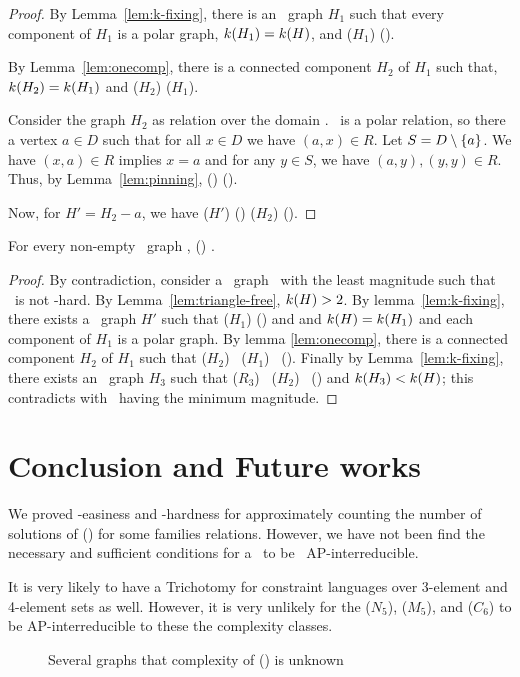 \begin{proof}
By Lemma~\ref{lem:k-fixing}, there is an \RBA\ graph \(H_1\) such that
every component of \(H_1\) is a polar graph, \(k(H_1)=k(H)\), and 
\chom(\(H_1\)) \maple \chom(\mH)\@.

By Lemma~\ref{lem:onecomp}, there is a connected component \(H_2\) of \(H_1\) such that,
\(k(H_2)=k(H_1)\) and \chom(\(H_2\)) \maple \chom(\(H_1\))\@.

Consider the graph \(H_2\) as relation \mR over the domain \mD\@.
\mR\ is a polar relation, so there a vertex \(a \in D\) such that for all \(x \in D\)
we have \((a, x)\in R\)\@. Let \(S = D \setminus \{{a}\}\)\@. We have
\((x,a)\in R\) implies \(x=a\) and for any \(y \in S\), we have \((a, y), (y, y)\in R\)\@.
Thus, by Lemma~\ref{lem:pinning}, \ccsp() \maple \ccsp(\mR)\@.

Now, for \(H'=H_2 - a\), we have  \chom(\(H'\)) \maple \ccsp() \maple
\chom(\(H_2\)) \maple \chom(\mH)\@.
\end{proof}

\begin{theorem}
For every non-empty \RBA\ graph \mH, \chom(\mH) \mapge \cbis\@.
\end{theorem}


\begin{proof}
By contradiction, consider a \RBA\ graph \mH\ with the least magnitude
such that \mH\ is not \cbis -hard. By Lemma~\ref{lem:triangle-free}, \(k(H) > 2\)\@. 
By lemma~\ref{lem:k-fixing}, there exists a \RBA\ graph \(H'\) such that 
\chom(\(H_1\)) \maple \chom(\mH) and  
and \(k(H)=k(H_1)\) and each component of \(H_1\) is a polar graph. 
By lemma \ref{lem:onecomp}, there is a connected component \(H_2\)
of \(H_1\) such that \chom(\(H_2\)) \maple\ \chom(\(H_1\)) \maple\ \chom(\mH)\@.
Finally  by Lemma~\ref{lem:k-fixing}, there exists an \RBA\ graph \(H_3\) such that 
\chom(\(R_3\)) \maple\ \chom(\(H_2\)) \maple\ \chom(\mH) 
and \(k(H_3) < k(H)\); this contradicts with \mH\ having the minimum magnitude.
\end{proof}

\section{Conclusion and Future works}
We proved \cbis -easiness and \cbis -hardness for approximately counting the number of solutions 
of \ccsp(\mrelset) for some families relations. However, we have not been find the necessary and
sufficient conditions for a \mrelset\ to be \cbis\ AP-interreducible.

It is very likely to have a Trichotomy for constraint languages over 3-element and 4-element sets as 
well. However, it is very unlikely for the \chom(\(N_5\)), \chom(\(M_5\)), and \chom(\(C_6\)) to
be AP-interreducible to these the complexity classes.

\begin{figure}
\centering
\subfigure[\(N_5\)]{\label{fig:n5}}\hfill
\subfigure[\(M_5\)]{\label{fig:m5}}\hfill
\subfigure[\(C_6\)]{\label{fig:c6}}
\caption{Several graphs that complexity of \chom(\mH) is unknown}
\end{figure}